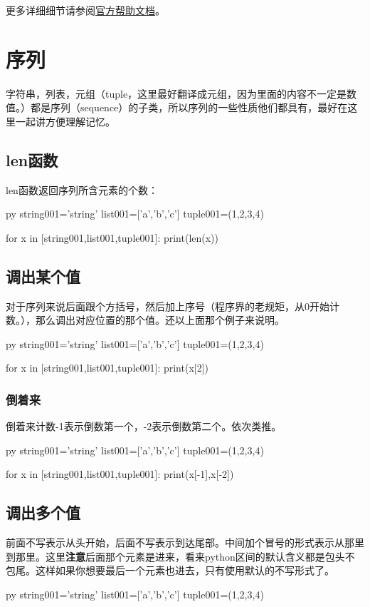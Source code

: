 \documentclass[12pt,oneside]{book}
\begin{document}
\begin{common-format}
更多详细细节请参阅\href{http://docs.python.org/3.4/library/random.html}{官方帮助文档}。











\section{序列}
字符串，列表，元组（tuple，这里最好翻译成元组，因为里面的内容不一定是数值。）都是序列（sequence）的子类，所以序列的一些性质他们都具有，最好在这里一起讲方便理解记忆。

\subsection{len函数}
len函数返回序列所含元素的个数：
\begin{xverbatim}[129]{py}
string001='string'
list001=['a','b','c']
tuple001=(1,2,3,4)

for x in [string001,list001,tuple001]:
    print(len(x))
\end{xverbatim}


\subsection{调出某个值}
对于序列来说后面跟个方括号，然后加上序号（程序界的老规矩，从0开始计数。），那么调出对应位置的那个值。还以上面那个例子来说明。
\begin{xverbatim}[129]{py}
string001='string'
list001=['a','b','c']
tuple001=(1,2,3,4)

for x in [string001,list001,tuple001]:
    print(x[2])
\end{xverbatim}

\subsubsection{倒着来}
倒着来计数-1表示倒数第一个，-2表示倒数第二个。依次类推。
\begin{xverbatim}[129]{py}
string001='string'
list001=['a','b','c']
tuple001=(1,2,3,4)

for x in [string001,list001,tuple001]:
    print(x[-1],x[-2])
\end{xverbatim}

\subsection{调出多个值}
\label{sec:调出多个值}
前面不写表示从头开始，后面不写表示到达尾部。中间加个冒号的形式表示从那里到那里。这里\textbf{注意}后面那个元素是进来，看来python区间的默认含义都是包头不包尾。这样如果你想要最后一个元素也进去，只有使用默认的不写形式了。
\begin{xverbatim}[129]{py}
string001='string'
list001=['a','b','c']
tuple001=(1,2,3,4)


\end{xverbatim}
\end{common-format}
\end{document}
